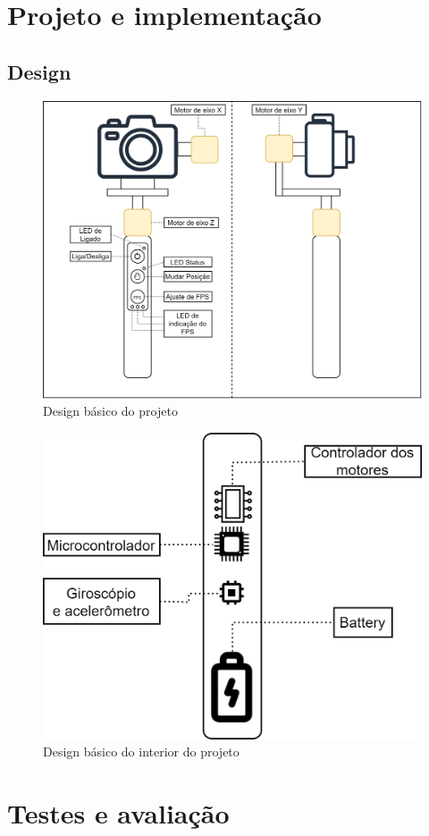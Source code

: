 \section{Projeto e implementação}

\subsection{Design}

\begin{figure}[H]
    \centering
    \includegraphics[width=1\textwidth,angle=0]{figures/Design.png}
    \caption{Design básico do projeto}
\end{figure}

\begin{figure}[H]
    \centering
    \includegraphics[width=1\textwidth,angle=0]{figures/Design-Page-2.png}
    \caption{Design básico do interior do projeto}
\end{figure}

\section{Testes e avaliação}



